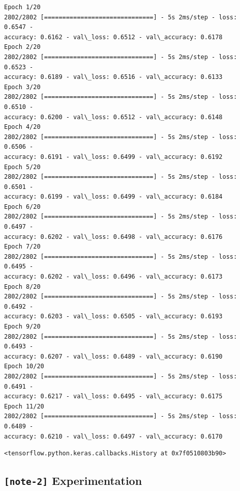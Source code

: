 \documentclass[11pt, twoside]{article}
\makeatletter
\newcommand{\boxspacing}{\kern\kvtcb@left@rule\kern\kvtcb@boxsep}
\newcommand{\prompt}[4]{
        \ttfamily\llap{{\color{#2}[#3]:\hspace{3pt}#4}}\vspace{-\baselineskip}
    }
\makeatother
\begin{document}
    \begin{Verbatim}[commandchars=\\\{\}]
Epoch 1/20
2802/2802 [==============================] - 5s 2ms/step - loss: 0.6547 -
accuracy: 0.6162 - val\_loss: 0.6512 - val\_accuracy: 0.6178
Epoch 2/20
2802/2802 [==============================] - 5s 2ms/step - loss: 0.6523 -
accuracy: 0.6189 - val\_loss: 0.6516 - val\_accuracy: 0.6133
Epoch 3/20
2802/2802 [==============================] - 5s 2ms/step - loss: 0.6510 -
accuracy: 0.6200 - val\_loss: 0.6512 - val\_accuracy: 0.6148
Epoch 4/20
2802/2802 [==============================] - 5s 2ms/step - loss: 0.6506 -
accuracy: 0.6191 - val\_loss: 0.6499 - val\_accuracy: 0.6192
Epoch 5/20
2802/2802 [==============================] - 5s 2ms/step - loss: 0.6501 -
accuracy: 0.6199 - val\_loss: 0.6499 - val\_accuracy: 0.6184
Epoch 6/20
2802/2802 [==============================] - 5s 2ms/step - loss: 0.6497 -
accuracy: 0.6202 - val\_loss: 0.6498 - val\_accuracy: 0.6176
Epoch 7/20
2802/2802 [==============================] - 5s 2ms/step - loss: 0.6495 -
accuracy: 0.6202 - val\_loss: 0.6496 - val\_accuracy: 0.6173
Epoch 8/20
2802/2802 [==============================] - 5s 2ms/step - loss: 0.6492 -
accuracy: 0.6203 - val\_loss: 0.6505 - val\_accuracy: 0.6193
Epoch 9/20
2802/2802 [==============================] - 5s 2ms/step - loss: 0.6493 -
accuracy: 0.6207 - val\_loss: 0.6489 - val\_accuracy: 0.6190
Epoch 10/20
2802/2802 [==============================] - 5s 2ms/step - loss: 0.6491 -
accuracy: 0.6217 - val\_loss: 0.6495 - val\_accuracy: 0.6175
Epoch 11/20
2802/2802 [==============================] - 5s 2ms/step - loss: 0.6489 -
accuracy: 0.6210 - val\_loss: 0.6497 - val\_accuracy: 0.6170
    \end{Verbatim}

            \begin{tcolorbox}[breakable, size=fbox, boxrule=.5pt, pad at break*=1mm, opacityfill=0]
\prompt{Out}{outcolor}{7}{\boxspacing}
\begin{Verbatim}[commandchars=\\\{\}]
<tensorflow.python.keras.callbacks.History at 0x7f0510803b90>
\end{Verbatim}
\end{tcolorbox}
        
    \hypertarget{note-2-experimentation}{%
\subsection{\texorpdfstring{\texttt{{[}note-2{]}}
Experimentation}{{[}note-2{]} Experimentation}}\label{note-2-experimentation}}
\end{document}
